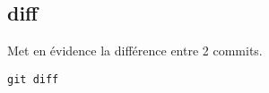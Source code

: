 \subsection*{diff}
Met en évidence la différence entre 2 commits.

\begin{verbatim}
git diff
\end{verbatim}

